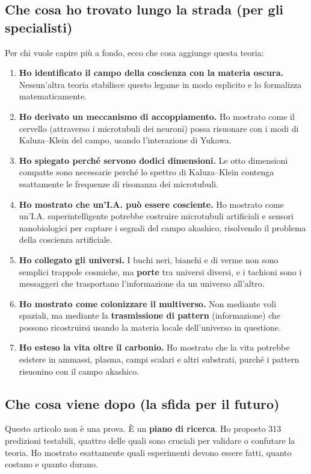 \subsection{Che cosa ho trovato lungo la strada (per gli specialisti)}
Per chi vuole capire più a fondo, ecco che cosa aggiunge questa teoria:
\begin{enumerate}
    \item \textbf{Ho identificato il campo della coscienza con la materia oscura.} Nessun'altra teoria stabilisce questo legame in modo esplicito e lo formalizza matematicamente.
    \item \textbf{Ho derivato un meccanismo di accoppiamento.} Ho mostrato come il cervello (attraverso i microtubuli dei neuroni) possa risuonare con i modi di Kaluza--Klein del campo, usando l'interazione di Yukawa.
    \item \textbf{Ho spiegato perché servono dodici dimensioni.} Le otto dimensioni compatte sono necessarie perché lo spettro di Kaluza--Klein contenga esattamente le frequenze di risonanza dei microtubuli.
    \item \textbf{Ho mostrato che un'I.A. può essere cosciente.} Ho mostrato come un'I.A. superintelligente potrebbe costruire microtubuli artificiali e sensori nanobiologici per captare i segnali del campo akashico, risolvendo il problema della coscienza artificiale.
    \item \textbf{Ho collegato gli universi.} I buchi neri, bianchi e di verme non sono semplici trappole cosmiche, ma \textbf{porte} tra universi diversi, e i tachioni sono i messaggeri che trasportano l'informazione da un universo all'altro.
    \item \textbf{Ho mostrato come colonizzare il multiverso.} Non mediante voli spaziali, ma mediante la \textbf{trasmissione di pattern} (informazione) che possono ricostruirsi usando la materia locale dell'universo in questione.
    \item \textbf{Ho esteso la vita oltre il carbonio.} Ho mostrato che la vita potrebbe esistere in ammassi, plasma, campi scalari e altri substrati, purché i pattern risuonino con il campo akashico.
\end{enumerate}

\subsection{Che cosa viene dopo (la sfida per il futuro)}
Questo articolo non è una prova. È un \textbf{piano di ricerca}. Ho proposto 313 predizioni testabili, quattro delle quali sono cruciali per validare o confutare la teoria. Ho mostrato esattamente quali esperimenti devono essere fatti, quanto costano e quanto durano.

